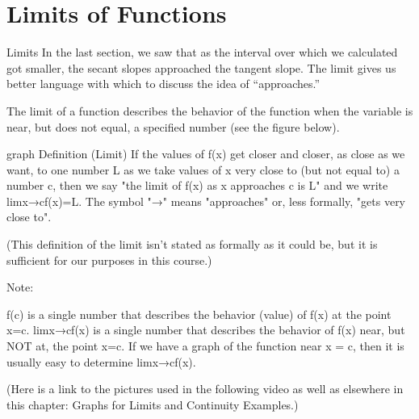 \section{Limits of Functions}
\label{sec:limits}

Limits
In the last section, we saw that as the interval over which we calculated got smaller, the secant slopes approached the tangent slope. The limit gives us better language with which to discuss the idea of “approaches.”

The limit of a function describes the behavior of the function when the variable is near, but does not equal, a specified number (see the figure below).

graph
Definition (Limit)
If the values of f(x) get closer and closer, as close as we want, to one number L as we take values of x very close to (but not equal to) a number c, then we say "the limit of f(x) as x approaches c is L" and we write
limx→cf(x)=L.
The symbol "→" means "approaches" or, less formally, "gets very close to".

(This definition of the limit isn't stated as formally as it could be, but it is sufficient for our purposes in this course.)

Note:

f(c) is a single number that describes the behavior (value) of f(x) at the point x=c.
limx→cf(x) is a single number that describes the behavior of f(x) near, but NOT at, the point x=c.
If we have a graph of the function near x = c, then it is usually easy to determine limx→cf(x).

(Here is a link to the pictures used in the following video as well as elsewhere in this chapter: Graphs for Limits and Continuity Examples.)

